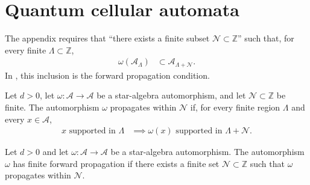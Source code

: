 \section{Quantum cellular automata}

The appendix requires that ``there exists a finite subset
$\mathcal N\subset\mathbb Z$'' such that, for every finite
$\Lambda\subset\mathbb Z$,
\begin{align}
    \omega(\mathcal A_\Lambda) & \subset
    \mathcal A_{\Lambda+\mathcal N}.
\end{align}
In \cite[line~2298]{Cirac2017MPU}, this inclusion is the forward propagation
condition.

\begin{definition}
    \label{def:qca_propagates_within}
    \leanok
    Let $d>0$, let $\omega\colon\mathcal A\to\mathcal A$ be a star-algebra
    automorphism, and let $\mathcal N\subset\mathbb Z$ be finite.  The
    automorphism $\omega$ propagates within $\mathcal N$ if, for every finite
    region $\Lambda$ and every $x\in\mathcal A$,
    \begin{align}
        x\text{ supported in }\Lambda
         & \implies
        \omega(x)\text{ supported in }\Lambda+\mathcal N.
    \end{align}
\end{definition}

\begin{definition}
    \label{def:qca_finite_propagation}
    \leanok
    Let $d>0$ and let $\omega\colon\mathcal A\to\mathcal A$ be a star-algebra
    automorphism.  The automorphism $\omega$ has finite forward propagation if
    there exists a finite set $\mathcal N\subset\mathbb Z$ such that $\omega$
    propagates within $\mathcal N$.
\end{definition}

